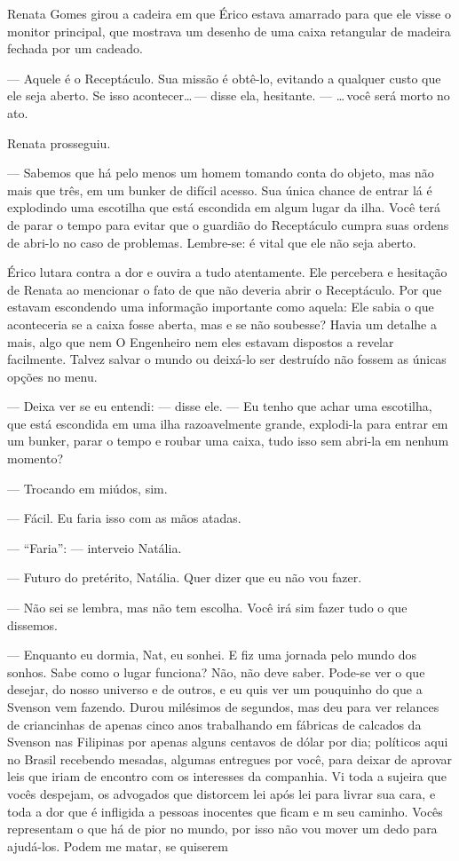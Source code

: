 Renata Gomes girou a cadeira em que Érico estava amarrado para que ele
visse o monitor principal, que mostrava um desenho de uma caixa
retangular de madeira fechada por um cadeado.

--- Aquele é o Receptáculo. Sua missão é obtê-lo, evitando a qualquer
custo que ele seja aberto. Se isso acontecer\ldots\,--- disse ela,
hesitante. --- \ldots\,você será morto no ato.

Renata prosseguiu.

--- Sabemos que há pelo menos um homem tomando conta do objeto, mas não
mais que três, em um bunker de difícil acesso. Sua única chance de
entrar lá é explodindo uma escotilha que está escondida em algum lugar
da ilha. Você terá de parar o tempo para evitar que o guardião do
Receptáculo cumpra suas ordens de abri-lo no caso de problemas.
Lembre-se: é vital que ele não seja aberto.

Érico lutara contra a dor e ouvira a tudo atentamente. Ele percebera e
hesitação de Renata ao mencionar o fato de que não deveria abrir o
Receptáculo. Por que estavam escondendo uma informação importante como
aquela: Ele sabia o que aconteceria se a caixa fosse aberta, mas e se
não soubesse? Havia um detalhe a mais, algo que nem O Engenheiro nem
eles estavam dispostos a revelar facilmente. Talvez salvar o mundo ou
deixá-lo ser destruído não fossem as únicas opções no menu.

--- Deixa ver se eu entendi: --- disse ele. --- Eu tenho que achar uma
escotilha, que está escondida em uma ilha razoavelmente grande,
explodi-la para entrar em um bunker, parar o tempo e roubar uma caixa,
tudo isso sem abri-la em nenhum momento?

--- Trocando em miúdos, sim.

--- Fácil. Eu faria isso com as mãos atadas.

--- “Faria”: --- interveio Natália.

--- Futuro do pretérito, Natália. Quer dizer que eu não vou fazer.

--- Não sei se lembra, mas não tem escolha. Você irá sim fazer tudo o
que dissemos.

--- Enquanto eu dormia, Nat, eu sonhei. E fiz uma jornada pelo mundo dos
sonhos. Sabe como o lugar funciona? Não, não deve saber. Pode-se ver o
que desejar, do nosso universo e de outros, e eu quis ver um pouquinho
do que a Svenson vem fazendo. Durou milésimos de segundos, mas deu para
ver relances de criancinhas de apenas cinco anos trabalhando em 
fábricas de calcados da Svenson nas Filipinas por apenas alguns 
centavos de dólar por dia; políticos aqui no Brasil recebendo mesadas, 
algumas entregues por você, para deixar de aprovar leis que iriam de 
encontro com os interesses da companhia. Vi toda a sujeira que vocês 
despejam, os advogados que distorcem lei após lei para livrar sua 
cara, e toda a dor que é infligida a pessoas inocentes que ficam e m
seu caminho. Vocês representam o que há de pior no mundo, por isso não 
vou mover um dedo para ajudá-los. Podem me matar, se quiserem 

